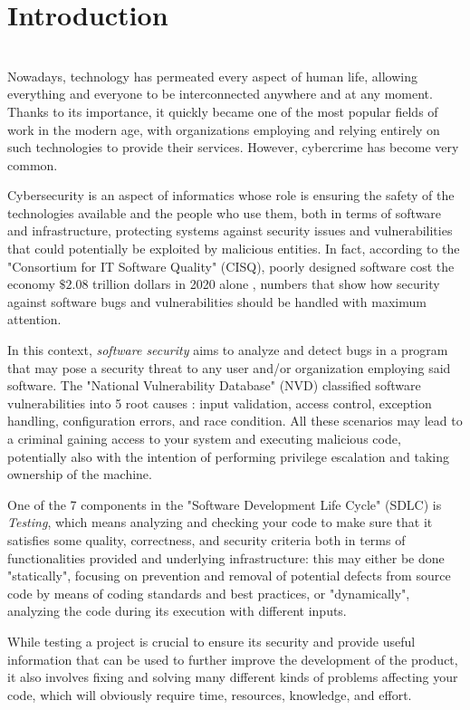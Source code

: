 \chapter{Introduction}
\ \\

Nowadays, technology has permeated every aspect of human life, allowing everything and everyone to be interconnected anywhere and at any moment. Thanks to its importance, it quickly became one of the most popular fields of work in the modern age, with organizations employing and relying entirely on such technologies to provide their services. However, cybercrime has become very common. 

Cybersecurity is an aspect of informatics whose role is ensuring the safety of the technologies available and the people who use them, both in terms of software and infrastructure, protecting systems against security issues and vulnerabilities that could potentially be exploited by malicious entities. In fact, according to the "Consortium for IT Software Quality" (CISQ), poorly designed software cost the economy $\$2.08$ trillion dollars in 2020 alone \cite{forbes}, numbers that show how security against software bugs and vulnerabilities should be handled with maximum attention.

In this context, \textit{software security} aims to analyze and detect bugs in a program that may pose a security threat to any user and/or organization employing said software. The "National Vulnerability Database" (NVD) classified software vulnerabilities into 5 root causes \cite{nist}: input validation, access control, exception handling, configuration errors, and race condition. All these scenarios may lead to a criminal gaining access to your system and executing malicious code, potentially also with the intention of performing privilege escalation and taking ownership of the machine. 

One of the 7 components in the "Software Development Life Cycle" (SDLC) is \textit{Testing}, which means analyzing and checking your code to make sure that it satisfies some quality, correctness, and security criteria both in terms of functionalities provided and underlying infrastructure: this may either be done "statically", focusing on prevention and removal of potential defects from source code by means of coding standards and best practices, or "dynamically", analyzing the code during its execution with different inputs.

While testing a project is crucial to ensure its security and provide useful information that can be used to further improve the development of the product, it also involves fixing and solving many different kinds of problems affecting your code, which will obviously require time, resources, knowledge, and effort.   






